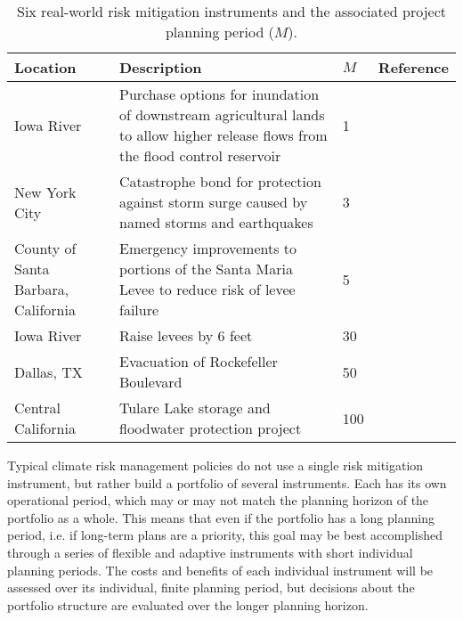 \documentclass[
  draft,
  linenumbers
]{agujournal2019}
\begin{document}
\noindent\begin{table}
  {\footnotesize
    \begin{tabular}{L{1in}L{2.5in}L{0.3in}L{1.7in}}
      \toprule
      Location & Description & $M$ & Reference \\
      \midrule
      Iowa River & Purchase options for inundation of downstream agricultural lands to allow higher release flows from the flood control reservoir & 1 & \citet{Spence:2016ca} \\
      New York City & Catastrophe bond for protection against storm surge caused by named storms and earthquakes & 3 &  \\
      County of Santa Barbara, California & Emergency improvements to portions of the Santa Maria Levee to reduce risk of levee failure & 5 & \citet{USACE:2007ta} \\
      Iowa River & Raise levees by 6 feet & 30 & \citet{Spence:2016ca} \\
      Dallas, TX & Evacuation of Rockefeller Boulevard & 50 & \citet{USACE:2014vn} \\
      Central California & Tulare Lake storage and floodwater protection project & 100 & \citet{GEI:gIaEZ-gS} \\
      \bottomrule
    \end{tabular}
    \caption{
      Six real-world risk mitigation instruments and the associated project planning period ($M$).
    }\label{tab:real-world-M}
  }
\end{table}

Typical climate risk management policies do not use a single risk mitigation instrument, but rather build a portfolio of several instruments.
Each has its own operational period, which may or may not match the planning horizon of the portfolio as a whole.
This means that even if the portfolio has a long planning period, i.e.\@\xspace if long-term plans are a priority, this goal may be best accomplished through a series of flexible and adaptive instruments with short individual planning periods.
The costs and benefits of each individual instrument will be assessed over its individual, finite planning period, but decisions about the portfolio structure are evaluated over the longer planning horizon.
\end{document}
